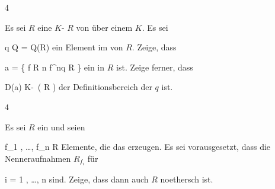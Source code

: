 {4}
{





Es sei $R$ eine
$K$-
$R$ von
über einem
$K$. Es sei

\mavergleichskette
{\vergleichskette
{ q
}
{ \in }{ Q
}
{ = }{ Q(R)
}
{    }{
}
{   }{
}
}
{}{}{}
ein Element im
von $R$. Zeige, dass

\mavergleichskettedisp
{\vergleichskette
{ {\mathfrak a}
}
{ =} { \left\{ f \in R  \mid  {} n \in \N {} f^nq \in R        \right\}
}
{ } {
}
{ } {
}
{ } {
}
}
{}{}{}
ein
in $R$ ist. Zeige ferner, dass

\mavergleichskette
{\vergleichskette
{ D({\mathfrak a})
}
{ \subseteq }{ K\!-\!\, \left(  R  \right)
}
{  }{
}
{    }{
}
{   }{
}
}
{}{}{}
der
 {} {}
Definitionsbereich der
$q$ ist.





}
{} {}

{4}
{





Es sei $R$ ein
und seien

\mavergleichskette
{\vergleichskette
{ f_1 , \ldots , f_n
}
{ \in }{ R
}
{  }{
}
{    }{
}
{   }{
}
}
{}{}{}
Elemente, die das
erzeugen. Es sei vorausgesetzt, dass die Nenneraufnahmen $R_{f_i }$ für

\mavergleichskette
{\vergleichskette
{ i
}
{ = }{ 1 , \ldots ,  n
}
{  }{
}
{    }{
}
{   }{
}
}
{}{}{}
sind. Zeige, dass dann auch $R$ noethersch ist.





}
{} {}
